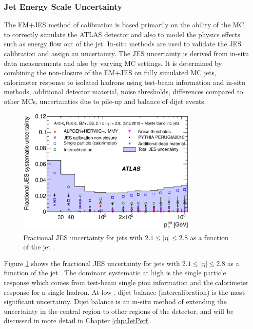 \subsubsection{Jet Energy Scale Uncertainty}

The EM+JES method of calibration is based primarily on the ability of the MC to correctly simulate the ATLAS detector and also to model the physics effects such as energy flow out of the jet.
In-situ methods are used to validate the JES calibration and assign an uncertainty.
The JES uncertainty is derived from in-situ data measurements and also by varying MC settings. 
It is determined by combining the non-closure of the EM+JES on fully simulated MC jets, calorimeter response to isolated hadrons using test-beam information and in-situ methods, additional detector material, noise thresholds, differences compared to other MCs, uncertainties due to pile-up and \pt{} balance of dijet events. 


\begin{figure}
\centering
\includegraphics[width=0.8\textwidth]{figures/Detector/JESSummary_JESUncertainty_AntiKt6Topo_EMJES2.1-2.8.eps}
\caption[JES Uncertainty]{ 
Fractional JES uncertainty for jets with $2.1\le|\eta|\le2.8$ as a function of the jet \pt{} \cite{ref:JES}. 
\label{Det:JESU}
}
\end{figure}

Figure \ref{Det:JESU} shows the fractional JES uncertainty for jets with $2.1\le|\eta|\le2.8$ as a function of the jet \pt{}.
The dominant systematic at high \pt{} is the single particle response which comes from test-beam single pion information and the calorimeter response for a single hadron.
At low \pt{}, dijet balance (intercalibration) is the most significant uncertainty.
Dijet balance is an in-situ method of extending the uncertainty in the central region to other regions of the detector, and will be discussed in more detail in Chapter \ref{chp:JetPerf}.


